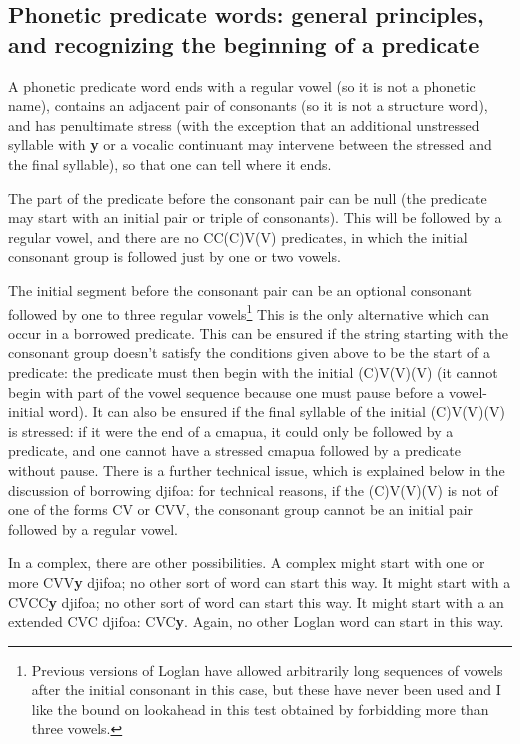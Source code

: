 \documentclass[12pt]{book}
\begin{document}
{\subsection{Phonetic predicate words:  general principles, and recognizing the beginning of a predicate}

A phonetic predicate word ends with a regular vowel (so it is not a phonetic name), contains an adjacent pair of consonants (so it is not a structure word), and has
penultimate stress (with the exception that an additional unstressed syllable with {\bf y} or a vocalic continuant may intervene between the stressed and the final syllable), so that one can tell where it ends.

The part of the predicate before the consonant pair can be null (the predicate may start with an initial pair or triple of consonants).  This will be followed by a regular vowel,
and there are no CC(C)V(V) predicates, in which the initial consonant group is followed just by one or two vowels.

The initial segment before the consonant pair can be an optional consonant followed by one to three regular vowels\footnote{Previous versions of Loglan have allowed arbitrarily long sequences of vowels after the initial consonant in this case, but these have never been used and I like the bound on lookahead in this test obtained by forbidding more than three vowels.}   This is the only alternative which can occur in a borrowed predicate.  This can be ensured if the string starting with the consonant group doesn't satisfy the conditions given above to be the start of a predicate:  the predicate must then begin with the initial (C)V(V)(V) (it cannot begin with part of the vowel sequence because one must pause before a vowel-initial word).  It can also be ensured if the final syllable of the initial (C)V(V)(V) is stressed:  if it were the end of a cmapua, it could only be followed by a predicate,
and one cannot have a stressed cmapua followed by a predicate without pause.  There is a further technical issue, which is explained below in the discussion of borrowing djifoa:
for technical reasons, if the (C)V(V)(V) is not of one of the forms CV or CVV, the consonant group cannot be an initial pair followed by a regular vowel.

In a complex, there are other possibilities.  A complex might start with one or more CVV{\bf y} djifoa; no other sort of word can start this way.  It might start with
a CVCC{\bf y} djifoa;  no other sort of word can start this way.  It might start with a an extended CVC djifoa:  CVC{\bf y}. Again, no other Loglan word can start in this way.

}
\end{document}
